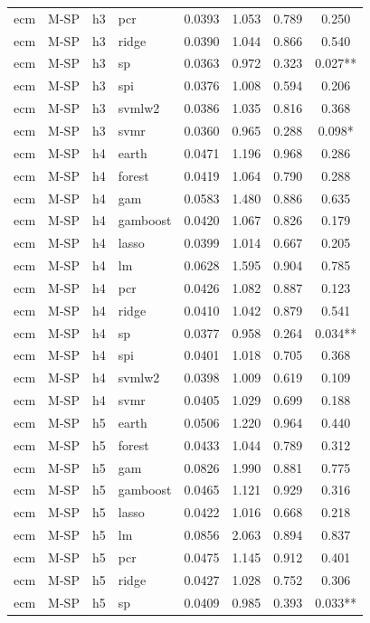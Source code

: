 \begin{ThreePartTable}
\begin{longtable}[t]{llclcccc}
ecm & M-SP & h3 & pcr & 0.0393 & 1.053 & 0.789 & 0.250\\
ecm & M-SP & h3 & ridge & 0.0390 & 1.044 & 0.866 & 0.540\\
ecm & M-SP & h3 & sp & 0.0363 & 0.972 & 0.323 & 0.027**\\
ecm & M-SP & h3 & spi & 0.0376 & 1.008 & 0.594 & 0.206\\
ecm & M-SP & h3 & svmlw2 & 0.0386 & 1.035 & 0.816 & 0.368\\
ecm & M-SP & h3 & svmr & 0.0360 & 0.965 & 0.288 & 0.098*\\
\addlinespace
ecm & M-SP & h4 & earth & 0.0471 & 1.196 & 0.968 & 0.286\\
ecm & M-SP & h4 & forest & 0.0419 & 1.064 & 0.790 & 0.288\\
ecm & M-SP & h4 & gam & 0.0583 & 1.480 & 0.886 & 0.635\\
ecm & M-SP & h4 & gamboost & 0.0420 & 1.067 & 0.826 & 0.179\\
ecm & M-SP & h4 & lasso & 0.0399 & 1.014 & 0.667 & 0.205\\
ecm & M-SP & h4 & lm & 0.0628 & 1.595 & 0.904 & 0.785\\
ecm & M-SP & h4 & pcr & 0.0426 & 1.082 & 0.887 & 0.123\\
ecm & M-SP & h4 & ridge & 0.0410 & 1.042 & 0.879 & 0.541\\
ecm & M-SP & h4 & sp & 0.0377 & 0.958 & 0.264 & 0.034**\\
ecm & M-SP & h4 & spi & 0.0401 & 1.018 & 0.705 & 0.368\\
ecm & M-SP & h4 & svmlw2 & 0.0398 & 1.009 & 0.619 & 0.109\\
ecm & M-SP & h4 & svmr & 0.0405 & 1.029 & 0.699 & 0.188\\
\addlinespace
ecm & M-SP & h5 & earth & 0.0506 & 1.220 & 0.964 & 0.440\\
ecm & M-SP & h5 & forest & 0.0433 & 1.044 & 0.789 & 0.312\\
ecm & M-SP & h5 & gam & 0.0826 & 1.990 & 0.881 & 0.775\\
ecm & M-SP & h5 & gamboost & 0.0465 & 1.121 & 0.929 & 0.316\\
ecm & M-SP & h5 & lasso & 0.0422 & 1.016 & 0.668 & 0.218\\
ecm & M-SP & h5 & lm & 0.0856 & 2.063 & 0.894 & 0.837\\
ecm & M-SP & h5 & pcr & 0.0475 & 1.145 & 0.912 & 0.401\\
ecm & M-SP & h5 & ridge & 0.0427 & 1.028 & 0.752 & 0.306\\
ecm & M-SP & h5 & sp & 0.0409 & 0.985 & 0.393 & 0.033**\\

\end{longtable}
\end{ThreePartTable}
